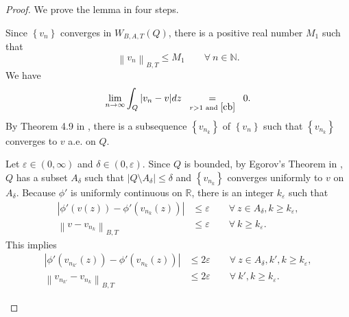 \documentclass[11pt, a4paper]{article}
\numberwithin{equation}{section}
\newcommand{\coex}[2][\hphantom{longexplanation}]{%
  \underset{{#1}}{\overset{\hphantom{longexplanation}}{#2}}
}
\newcommand{\NN}{{\mathbb N}}
\newcommand{\RR}{{\mathbb R}}
\newcommand{\abs}[1]{\left\lvert #1\right\rvert}
\newcommand{\norm}[1]{\left\lVert #1\right\rVert}
\begin{document}
\begin{proof}  We  prove the lemma in four steps.
  \begin{description}[wide]
\item[Step 1.]
 Since $\left\{v_{n}\right\}$
converges in $W_{B,A,T}(Q)$, there is a positive real number $M_{1}$
such that
\begin{equation}
  \norm{v_{n}}_{B,T}\le M_{1}\qquad \forall~n\in\NN.
  \label{47z0}
\end{equation}
We have
\[
  \lim_{n\to \infty}\int_{Q}|v_n{}-v|dz \coex[r > 1 \text{ and }\eqref{cb}]{=} 0.
\]
By Theorem 4.9 in \cite[p.94]{brezisFunctionalAnalysisSobolev2011},
there is a subsequence $\left\{v_{n_{k}}\right\}$ of
$\left\{v_{n}\right\}$ such that $\left\{v_{n_{k}}\right\}$ converges
to $v$ a.e. on $Q$.

Let $\varepsilon \in(0,\infty)$ and $\delta \in (0,\varepsilon)$. Since $Q$
is bounded, by Egorov's Theorem in
\cite[p.115]{brezisFunctionalAnalysisSobolev2011}, $Q$ has a subset
$A_{\delta}$ such that $\abs{Q\setminus A_{\delta}}\le \delta$ and
$\left\{v_{n_{k}}\right\}$ converges uniformly to $v$ on
$A_{\delta}$. Because $\phi'$ is uniformly continuous on $\RR$, there
is an integer $k_{\varepsilon}$ such that 
\begin{align*}
  \abs{\phi'(v(z))-\phi'(v_{n_{k}}(z))}
  &\le \varepsilon \qquad\forall~z \in A_{\delta}, k\ge k_{\varepsilon},\\
  \norm{v - v_{n_k}}_{B,T}
  &\le \varepsilon\qquad\forall~ k\ge k_{\varepsilon}.
\end{align*}
This implies
 \begin{align}
   \abs{\phi'(v_{n_{k'}}(z))-\phi'(v_{n_{k}}(z))}
   &\le 2\varepsilon \qquad\forall~z \in A_{\delta}, k', k\ge k_{\varepsilon},
  \label{47z2}\\
   \norm{v_{n_{k'}} -  v_{n_{k}}}_{B,T}
   &\le 2\varepsilon\qquad\forall~ k',k\ge k_{\varepsilon}.
  \label{247z3}
 \end{align}
 

\end{description}
\end{proof}
\end{document}
